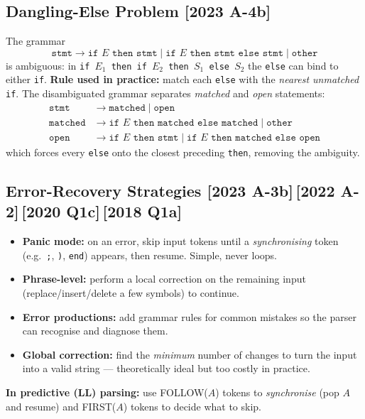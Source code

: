 \documentclass[12pt, a4paper]{article}
\newenvironment{qbox}{\begin{mdframed}[style=qframe]}{\end{mdframed}}
\newcommand{\yr}[1]{{\small\color{accent}\textbf{[#1]}}}
\newcommand{\term}[1]{\textbf{\color{keyblue}#1}}
\begin{document}
\subsection{Dangling-Else Problem \yr{2023 A-4b}}
\begin{qbox}
The grammar
\[ \texttt{stmt}\to \texttt{if } E \texttt{ then stmt} \mid \texttt{if } E \texttt{ then stmt else stmt}\mid \texttt{other} \]
is ambiguous: in \texttt{if }$E_1$\texttt{ then if }$E_2$\texttt{ then }$S_1$\texttt{ else }$S_2$ the \texttt{else}
can bind to either \texttt{if}. \textbf{Rule used in practice:} match each \texttt{else} with the \emph{nearest unmatched}
\texttt{if}. The disambiguated grammar separates \emph{matched} and \emph{open} statements:
\[
\begin{aligned}
\texttt{stmt} &\to \texttt{matched} \mid \texttt{open}\\
\texttt{matched} &\to \texttt{if } E \texttt{ then matched else matched} \mid \texttt{other}\\
\texttt{open} &\to \texttt{if } E \texttt{ then stmt} \mid \texttt{if } E \texttt{ then matched else open}
\end{aligned}
\]
which forces every \texttt{else} onto the closest preceding \texttt{then}, removing the ambiguity.
\end{qbox}

\subsection{Error-Recovery Strategies \yr{2023 A-3b}\,\yr{2022 A-2}\,\yr{2020 Q1c}\,\yr{2018 Q1a}}
\begin{qbox}
\begin{itemize}
\item \term{Panic mode:} on an error, skip input tokens until a \emph{synchronising} token (e.g.\ \texttt{;}, \texttt{)}, \texttt{end}) appears, then resume. Simple, never loops.
\item \term{Phrase-level:} perform a local correction on the remaining input (replace/insert/delete a few symbols) to continue.
\item \term{Error productions:} add grammar rules for common mistakes so the parser can recognise and diagnose them.
\item \term{Global correction:} find the \emph{minimum} number of changes to turn the input into a valid string — theoretically ideal but too costly in practice.
\end{itemize}
\textbf{In predictive (LL) parsing:} use FOLLOW($A$) tokens to \emph{synchronise} (pop $A$ and resume) and FIRST($A$) tokens to decide what to skip.
\end{qbox}
\end{document}
